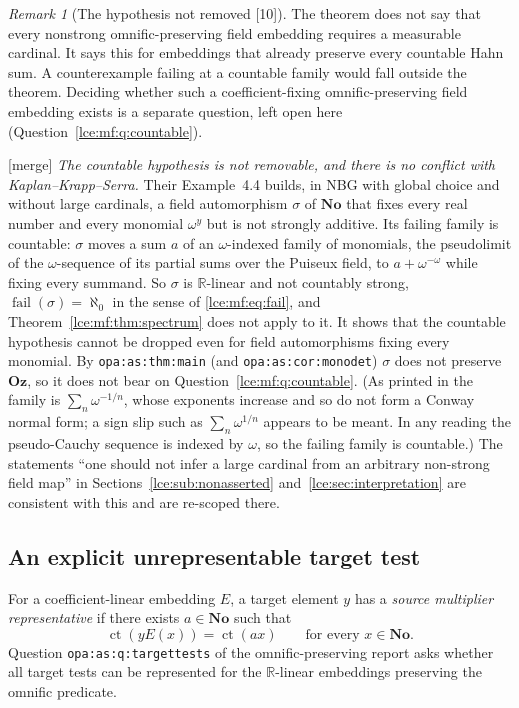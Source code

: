 \documentclass[11pt,letterpaper]{article}
\numberwithin{equation}{section}
\theoremstyle{definition}
\theoremstyle{remark}
\newtheorem{remark}[theorem]{Remark}
\newcommand{\No}{\mathbf{No}}
\newcommand{\Oz}{\mathbf{Oz}}
\newcommand{\R}{\mathbb R}
\newcommand{\ct}{\operatorname{ct}}
\newcommand{\thref}[1]{Theorem~\ref{#1}}
\newcommand{\src}[1]{\textup{\textsf{\small[#1]}}}%
\newcommand{\mergetag}{\textup{\textsf{\small[merge]}}}%
\newcommand{\lbl}[1]{\nolinkurl{#1}}%
\newcommand{\fail}{\operatorname{fail}}
\begin{document}
\begin{remark}[The hypothesis not removed \src{10}]\label{lce:mf:rem:unrestricted}
The theorem does not say that every nonstrong omnific-preserving field
embedding requires a measurable cardinal. It says this for embeddings that
already preserve every countable Hahn sum. A counterexample failing at a
countable family would fall outside the theorem. Deciding whether such a
coefficient-fixing omnific-preserving field embedding exists is a separate
question, left open here (Question~\ref{lce:mf:q:countable}).

\mergetag{} \emph{The countable hypothesis is not removable, and there is no
conflict with Kaplan--Krapp--Serra.} Their Example~4.4 \cite{KKS} builds, in
NBG with global choice and without large cardinals, a field automorphism
$\sigma$ of $\No$ that fixes every real number and every monomial
$\omega^y$ but is not strongly additive. Its failing family is countable:
$\sigma$ moves a sum $a$ of an $\omega$-indexed family of monomials, the
pseudolimit of the $\omega$-sequence of its partial sums over the Puiseux
field, to $a+\omega^{-\omega}$ while fixing every summand. So $\sigma$ is
$\R$-linear and not countably strong, $\fail(\sigma)=\aleph_0$ in the
sense of \eqref{lce:mf:eq:fail}, and \thref{lce:mf:thm:spectrum} does not
apply to it. It shows that the countable hypothesis cannot be dropped even
for field automorphisms fixing every monomial. By \lbl{opa:as:thm:main}
(and \lbl{opa:as:cor:monodet}) $\sigma$ does not preserve $\Oz$, so it does
not bear on Question~\ref{lce:mf:q:countable}. (As printed in
\cite[Example~4.4]{KKS} the family is $\sum_{n}\omega^{-1/n}$, whose
exponents increase and so do not form a Conway normal form; a sign slip such
as $\sum_n\omega^{1/n}$ appears to be meant. In any reading the pseudo-Cauchy
sequence is indexed by $\omega$, so the failing family is countable.) The
statements ``one should not infer a large cardinal from an arbitrary
non-strong field map'' in Sections~\ref{lce:sub:nonasserted}
and~\ref{lce:sec:interpretation} are consistent with this and are re-scoped
there.
\end{remark}

\subsection{An explicit unrepresentable target test}
For a coefficient-linear embedding $E$, a target element $y$ has a
\emph{source multiplier representative} if there exists $a\in\No$ such that
\begin{equation}\label{lce:mf:eq:targettest}
 \ct(yE(x))=\ct(ax)\qquad\text{for every }x\in\No.
\end{equation}
Question \lbl{opa:as:q:targettests} of the omnific-preserving report asks
whether all target tests can be represented for the $\R$-linear embeddings
preserving the omnific predicate.
\end{document}
